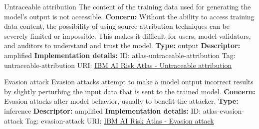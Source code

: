\documentclass[a4paper,12pt]{article}
\begin{document}
\begin{definitionbox}{Untraceable attribution}
The content of the training data used for generating the model's output is not accessible.\newline\newline
\textbf{Concern: }Without the ability to access training data content, the possibility of using source attribution techniques can be severely limited or impossible. This makes it difficult for users, model validators, and auditors to understand and trust the model.\newline\newline
\textbf{Type: }output\newline
\textbf{Descriptor: }amplified \newline\newline
\textbf{Implementation details: } \newline
ID: atlas-untraceable-attribution \newline
Tag: untraceable-attribution \newline
URI:  \href{https://www.ibm.com/docs/en/watsonx/saas?topic=SSYOK8/wsj/ai-risk-atlas/untraceable-attribution.html}{IBM AI Risk Atlas - Untraceable attribution}\newline
\end{definitionbox}
\begin{definitionbox}{Evasion attack}
Evasion attacks attempt to make a model output incorrect results by slightly perturbing the input data that is sent to the trained model.\newline\newline
\textbf{Concern: }Evasion attacks alter model behavior, usually to benefit the attacker.\newline\newline
\textbf{Type: }inference\newline
\textbf{Descriptor: }amplified \newline\newline
\textbf{Implementation details: } \newline
ID: atlas-evasion-attack \newline
Tag: evasion-attack \newline
URI:  \href{https://www.ibm.com/docs/en/watsonx/saas?topic=SSYOK8/wsj/ai-risk-atlas/evasion-attack.html}{IBM AI Risk Atlas - Evasion attack}\newline
\end{definitionbox}
\end{document}

